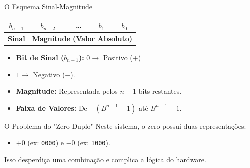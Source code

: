 \begin{frame}{O Esquema Sinal-Magnitude}


    \begin{center}
        \begin{tabular}{|c|c|c|c|c|}
            \hline
            $b_{n-1}$      & $b_{n-2}$                                                & \dots & $b_1$ & $b_0$ \\ \hline
            \textbf{Sinal} & \multicolumn{4}{c|}{\textbf{Magnitude (Valor Absoluto)}}                         \\ \hline
        \end{tabular}
    \end{center}

    \begin{itemize}
        \item \textbf{Bit de Sinal ($b_{n-1}$):} $0 \rightarrow$ Positivo ($+$)
        \item  $1 \rightarrow$ Negativo ($-$).
        \item \textbf{Magnitude:} Representada pelos $n-1$ bits restantes.
        \item \textbf{Faixa de Valores:} De $-(B^{n-1}-1)$ até $B^{n-1}-1$.
    \end{itemize}

    \begin{alertblock}{O Problema do "Zero Duplo"}
        Neste sistema, o zero possui duas representações:
        \begin{itemize}
            \item $+0$ (ex: \texttt{0000}) e $-0$ (ex: \texttt{1000}).
        \end{itemize}
        Isso desperdiça uma combinação e complica a lógica do hardware.
    \end{alertblock}
\end{frame}


